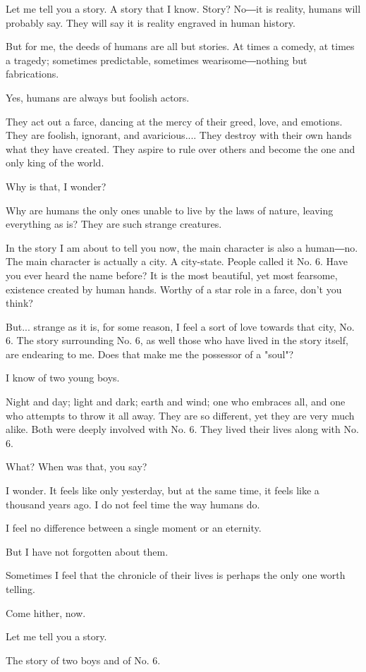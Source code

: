 
Let me tell you a story. A story that I know. Story? No―it is reality,
humans will probably say. They will say it is reality engraved in human
history.

But for me, the deeds of humans are all but stories. At times a comedy,
at times a tragedy; sometimes predictable, sometimes wearisome―nothing
but fabrications.

Yes, humans are always but foolish actors.

They act out a farce, dancing at the mercy of their greed, love, and
emotions. They are foolish, ignorant, and avaricious.... They destroy
with their own hands what they have created. They aspire to rule over
others and become the one and only king of the world.

Why is that, I wonder?

Why are humans the only ones unable to live by the laws of nature,
leaving everything as is? They are such strange creatures.

In the story I am about to tell you now, the main character is also a
human―no. The main character is actually a city. A city-state. People
called it No. 6. Have you ever heard the name before? It is the most
beautiful, yet most fearsome, existence created by human hands. Worthy
of a star role in a farce, don't you think?

But... strange as it is, for some reason, I feel a sort of love towards
that city, No. 6. The story surrounding No. 6, as well those who have
lived in the story itself, are endearing to me. Does that make me the
possessor of a "soul"?

I know of two young boys.

Night and day; light and dark; earth and wind; one who embraces all, and
one who attempts to throw it all away. They are so different, yet they
are very much alike. Both were deeply involved with No. 6. They lived
their lives along with No. 6.

What? When was that, you say?

I wonder. It feels like only yesterday, but at the same time, it feels
like a thousand years ago. I do not feel time the way humans do.

I feel no difference between a single moment or an eternity.

But I have not forgotten about them.

Sometimes I feel that the chronicle of their lives is perhaps the only
one worth telling.

Come hither, now.

Let me tell you a story.

The story of two boys and of No. 6.
